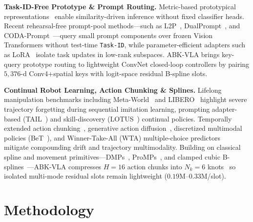 \documentclass[10pt,twocolumn]{article}
\begin{document}
\textbf{Task-ID-Free Prototype \& Prompt Routing.} Metric-based prototypical representations~\cite{snell2017} enable similarity-driven inference without fixed classifier heads. Recent rehearsal-free prompt-pool methods---such as L2P~\cite{wang2022l2p}, DualPrompt~\cite{wang2022dualprompt}, and CODA-Prompt~\cite{smith2023}---query small prompt components over frozen Vision Transformers without test-time \texttt{Task-ID}, while parameter-efficient adapters such as LoRA~\cite{hu2022lora} isolate task updates in low-rank subspaces. ABK-VLA brings key-query prototype routing to lightweight ConvNet closed-loop controllers by pairing $5{,}376$-d Conv4+spatial keys with logit-space residual B-spline slots.

\textbf{Continual Robot Learning, Action Chunking \& Splines.} Lifelong manipulation benchmarks including Meta-World~\cite{yu2020metaworld} and LIBERO~\cite{liu2023libero} highlight severe trajectory forgetting during sequential imitation learning, prompting adapter-based (TAIL~\cite{liu2024tail}) and skill-discovery (LOTUS~\cite{wan2024lotus}) continual policies. Temporally extended action chunking~\cite{zhao2023}, generative action diffusion~\cite{chi2023}, discretized multimodal policies (BeT~\cite{shafiullah2022}), and Winner-Take-All (WTA) multiple-choice predictors~\cite{guzman2012,rupprecht2017} mitigate compounding drift and trajectory multimodality. Building on classical spline and movement primitives---DMPs~\cite{ijspeert2013}, ProMPs~\cite{paraschos2013}, and clamped cubic B-splines~\cite{piegl1997}---ABK-VLA compresses $H=16$ action chunks into $N_k=6$ knots~\cite{piegl1997} so isolated multi-mode residual slots remain lightweight ($0.19\text{M}$--$0.33\text{M}$/slot).

\section{Methodology}
\end{document}
